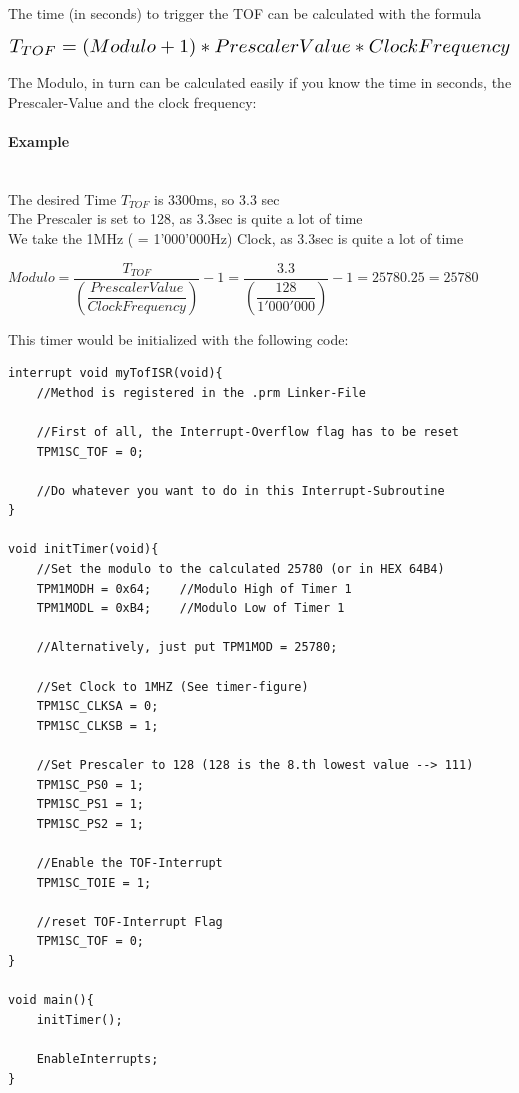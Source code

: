 \documentclass[a4paper, 11pt, nofootinbib]{article}
\begin{document}
\vspace{10px}

\noindent The time (in seconds) to trigger the TOF can be calculated with the formula

\[ \scalebox{1.5}{$T_{TOF} = (Modulo + 1) * PrescalerValue * ClockFrequency $} \]

\noindent The Modulo, in turn can be calculated easily if you know the time in seconds, the Prescaler-Value and the clock frequency:

\paragraph{Example}\mbox{}\\
The desired Time $T_{TOF}$ is 3300ms, so 3.3 sec \\
The Prescaler is set to 128, as 3.3sec is quite a lot of time \\
We take the 1MHz ( = 1'000'000Hz) Clock, as 3.3sec is quite a lot of time

$
Modulo = \dfrac{T_{TOF}}{(\dfrac{PrescalerValue}{ClockFrequency})} - 1 = \dfrac{3.3}{(\dfrac{128}{1'000'000})} - 1 = 25780.25 = 25780
$

This timer would be initialized with the following code: 
\begin{lstlisting}[caption={Timer initialization}]
interrupt void myTofISR(void){
	//Method is registered in the .prm Linker-File
	
	//First of all, the Interrupt-Overflow flag has to be reset
	TPM1SC_TOF = 0;
	
	//Do whatever you want to do in this Interrupt-Subroutine
}

void initTimer(void){
	//Set the modulo to the calculated 25780 (or in HEX 64B4)
	TPM1MODH = 0x64;	//Modulo High of Timer 1
	TPM1MODL = 0xB4;	//Modulo Low of Timer 1
	
	//Alternatively, just put TPM1MOD = 25780;
	
	//Set Clock to 1MHZ (See timer-figure)
	TPM1SC_CLKSA = 0;
	TPM1SC_CLKSB = 1;
	
	//Set Prescaler to 128 (128 is the 8.th lowest value --> 111)
	TPM1SC_PS0 = 1;
	TPM1SC_PS1 = 1;
	TPM1SC_PS2 = 1;
	
	//Enable the TOF-Interrupt
	TPM1SC_TOIE = 1;
	
	//reset TOF-Interrupt Flag
	TPM1SC_TOF = 0;
}

void main(){
	initTimer();
	
	EnableInterrupts;
}
\end{lstlisting}
\end{document}
